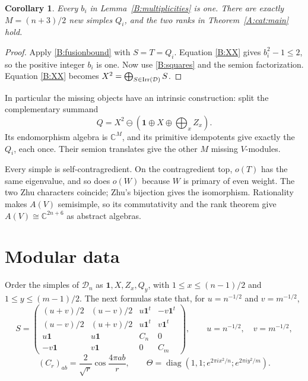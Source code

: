 \documentclass[11pt]{article}
\newtheorem{corollary}[theorem]{Corollary}
\newcommand{\C}{\mathbb C}\newcommand{\Q}{\mathbb Q}\newcommand{\Z}{\mathbb Z}
\newcommand{\one}{\mathbf1}\newcommand{\D}{\mathcal D}\newcommand{\Dcat}{\mathcal D}
\numberwithin{equation}{section}
\begin{document}
\begin{corollary}\label{B:rankthm}
Every $b_i$ in Lemma~\ref{B:multiplicities} is one. There are exactly $M=(n+3)/2$ new simples $Q_i$, and the two ranks in Theorem~\ref{A:cat:main} hold.
\end{corollary}
\begin{proof}
Apply \eqref{B:fusionbound} with $S=T=Q_i$. Equation \eqref{B:XX} gives $b_i^2-1\leq2$, so the positive integer $b_i$ is one. Now use \eqref{B:squares} and the semion factorization. Equation \eqref{B:XX} becomes $X^2=\bigoplus_{S\in\Irr(\D)}S$.
\end{proof}
In particular the missing objects have an intrinsic construction: split the complementary summand
\[
 Q=X^2\ominus\left(\one\oplus X\oplus\bigoplus_x Z_x\right).
\]
Its endomorphism algebra is $\C^M$, and its primitive idempotents give exactly the $Q_i$, each once. Their semion translates give the other $M$ missing $V$-modules.

Every simple is self-contragredient. On the contragredient top, $o(T)$ has the same eigenvalue, and so does $o(W)$ because $W$ is primary of even weight. The two Zhu characters coincide; Zhu's bijection gives the isomorphism. Rationality makes $A(V)$ semisimple, so its commutativity and the rank theorem give $A(V)\cong\C^{2n+6}$ as abstract algebras.

\section{Modular data}\label{sec:modular}
Order the simples of $\D_n$ as $\one,X,Z_x,Q_y$, with $1\leq x\leq(n-1)/2$ and $1\leq y\leq(m-1)/2$. The next formulas state that, for $u=n^{-1/2}$ and $v=m^{-1/2}$,
\begin{equation}\label{B:Sfull}
 S=\begin{pmatrix}
 (u+v)/2&(u-v)/2&u\mathbf1^{\!t}&-v\mathbf1^{\!t}\\
 (u-v)/2&(u+v)/2&u\mathbf1^{\!t}&v\mathbf1^{\!t}\\
 u\mathbf1&u\mathbf1&C_n&0\\
 -v\mathbf1&v\mathbf1&0&C_m
 \end{pmatrix},\qquad
 u=n^{-1/2},\quad v=m^{-1/2},
\end{equation}
\begin{equation}\label{B:Tfull}
 (C_r)_{ab}=\frac{2}{\sqrt r}\cos\frac{4\pi ab}{r},\qquad
 \Theta=\operatorname{diag}\left(1,1;
       e^{2\pi i x^2/n};e^{2\pi i y^2/m}\right).
\end{equation}
\end{document}
